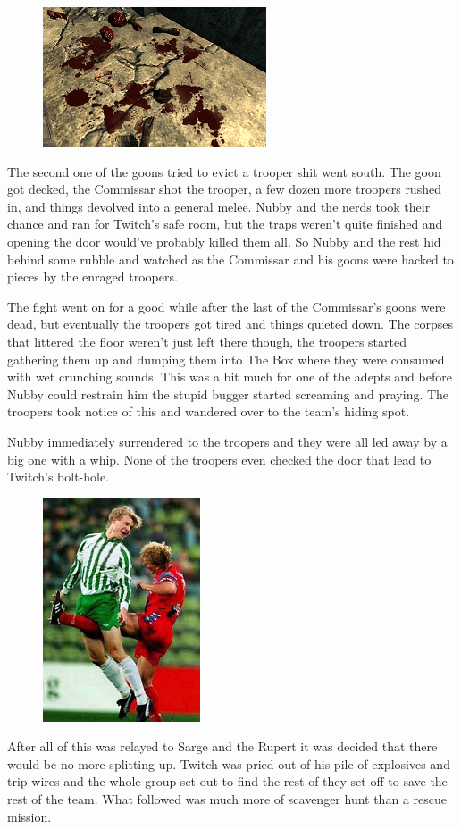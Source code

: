 \begin{figure}
	\begin{center}
		\includegraphics[width=\figwidth]{pics/4/23.png}
	\end{center}
\end{figure}
The second one of the goons tried to evict a trooper shit went south. 
The goon got decked, the Commissar shot the trooper, a few dozen more troopers rushed in, and things devolved into a general melee.
Nubby and the nerds took their chance and ran for Twitch's safe room, but the traps weren't quite finished and opening the door would’ve probably killed them all. 
So Nubby and the rest hid behind some rubble and watched as the Commissar and his goons were hacked to pieces by the enraged troopers.

The fight went on for a good while after the last of the Commissar's goons were dead, but eventually the troopers got tired and things quieted down. 
The corpses that littered the floor weren't just left there though, the troopers started gathering them up and dumping them into The Box where they were consumed with wet crunching sounds. 
This was a bit much for one of the adepts and before Nubby could restrain him the stupid bugger started screaming and praying. 
The troopers took notice of this and wandered over to the team's hiding spot.

Nubby immediately surrendered to the troopers and they were all led away by a big one with a whip. 
None of the troopers even checked the door that lead to Twitch's bolt-hole.

\begin{figure}
	\begin{center}
		\includegraphics[width=\figwidth]{pics/4/24.png}
	\end{center}
\end{figure}
After all of this was relayed to Sarge and the Rupert it was decided that there would be no more splitting up. 
Twitch was pried out of his pile of explosives and trip wires and the whole group set out to find the rest of they set off to save the rest of the team. 
What followed was much more of scavenger hunt than a rescue mission.

